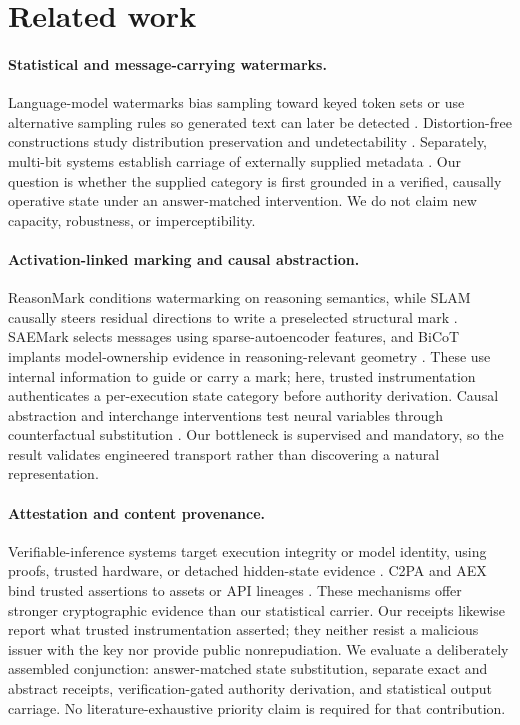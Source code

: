 \section{Related work}

\paragraph{Statistical and message-carrying watermarks.}
Language-model watermarks bias sampling toward keyed token sets or use alternative sampling rules so generated text can later be detected \citep{kirchenbauer2023watermark,dathathri2024scalable}. Distortion-free constructions study distribution preservation and undetectability \citep{kuditipudi2024robust,christ2024undetectable}. Separately, multi-bit systems establish carriage of externally supplied metadata \citep{wang2024codable,jiang2025stealthink}. Our question is whether the supplied category is first grounded in a verified, causally operative state under an answer-matched intervention. We do not claim new capacity, robustness, or imperceptibility.

\paragraph{Activation-linked marking and causal abstraction.}
ReasonMark conditions watermarking on reasoning semantics, while SLAM causally steers residual directions to write a preselected structural mark \citep{liu2026reasonmark,harelcanada2026slam}. SAEMark selects messages using sparse-autoencoder features, and BiCoT implants model-ownership evidence in reasoning-relevant geometry \citep{yu2025saemark,lu2026bicot}. These use internal information to guide or carry a mark; here, trusted instrumentation authenticates a per-execution state category before authority derivation. Causal abstraction and interchange interventions test neural variables through counterfactual substitution \citep{geiger2021causal,geiger2022inducing}. Our bottleneck is supervised and mandatory, so the result validates engineered transport rather than discovering a natural representation.

\paragraph{Attestation and content provenance.}
Verifiable-inference systems target execution integrity or model identity, using proofs, trusted hardware, or detached hidden-state evidence \citep{ghodsi2017safetynets,tramer2019slalom,sun2025svip}. C2PA and AEX bind trusted assertions to assets or API lineages \citep{c2pa2025,guan2026aex}. These mechanisms offer stronger cryptographic evidence than our statistical carrier. Our \hmac{} receipts likewise report what trusted instrumentation asserted; they neither resist a malicious issuer with the key nor provide public nonrepudiation. We evaluate a deliberately assembled conjunction: answer-matched state substitution, separate exact and abstract receipts, verification-gated authority derivation, and statistical output carriage. No literature-exhaustive priority claim is required for that contribution.
